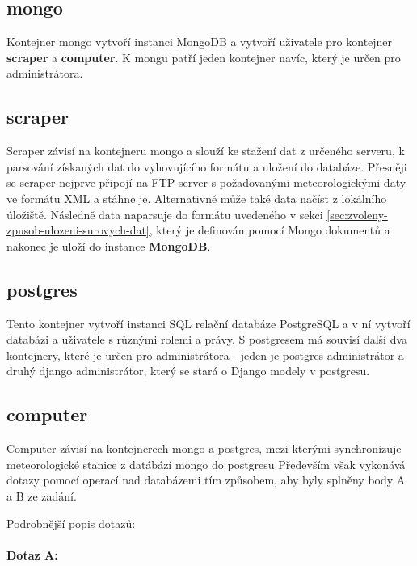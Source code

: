 \documentclass[10pt,a4paper,titlepage]{extarticle}
\begin{document}
\subsection{mongo}

Kontejner mongo vytvoří instanci MongoDB a vytvoří uživatele pro kontejner \textbf{scraper} a \textbf{computer}. K mongu patří jeden kontejner navíc, který je určen pro administrátora.

\subsection{scraper}

Scraper závisí na kontejneru mongo a slouží ke stažení dat z určeného serveru, k parsování získaných dat do vyhovujícího formátu a uložení do databáze. Přesněji se scraper nejprve připojí na FTP server s požadovanými meteorologickými daty  ve formátu XML a stáhne je. Alternativně může také data načíst z lokálního úložiště. Následně data naparsuje do formátu uvedeného v sekci \ref{sec:zvoleny-zpusob-ulozeni-surovych-dat}, který je definován pomocí Mongo dokumentů a nakonec je uloží do instance \textbf{MongoDB}.


\subsection{postgres}

Tento kontejner vytvoří instanci SQL relační databáze PostgreSQL a v ní vytvoří databázi a uživatele s různými rolemi a právy. S postgresem má souvisí další dva kontejnery, které je určen pro administrátora - jeden je postgres administrátor a druhý django administrátor, který se stará o Django modely v postgresu.

\subsection{computer}

Computer závisí na kontejnerech mongo a postgres, mezi kterými synchronizuje meteorologické stanice z datábází mongo do postgresu Především však vykonává dotazy pomocí operací nad databázemi tím způsobem, aby byly splněny body A a B ze zadání.

Podrobnější popis dotazů:

\paragraph{Dotaz A:}
\end{document}
